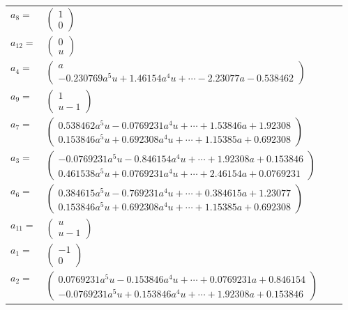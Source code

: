 \documentclass[1p]{elsarticle_modified}
\theoremstyle{definition}
\begin{document}
\begin{tabular}{m{7pt} m{180pt} m{7pt} m{180pt} }
\flushright $a_{8}=$&$\begin{pmatrix}1\\0\end{pmatrix}$ \\
\flushright $a_{12}=$&$\begin{pmatrix}0\\u\end{pmatrix}$ \\
\flushright $a_{4}=$&$\begin{pmatrix}a\\-0.230769 a^{5} u+1.46154 a^{4} u+\cdots-2.23077 a-0.538462\end{pmatrix}$ \\
\flushright $a_{9}=$&$\begin{pmatrix}1\\u-1\end{pmatrix}$ \\
\flushright $a_{7}=$&$\begin{pmatrix}0.538462 a^{5} u-0.0769231 a^{4} u+\cdots+1.53846 a+1.92308\\0.153846 a^{5} u+0.692308 a^{4} u+\cdots+1.15385 a+0.692308\end{pmatrix}$ \\
\flushright $a_{3}=$&$\begin{pmatrix}-0.0769231 a^{5} u-0.846154 a^{4} u+\cdots+1.92308 a+0.153846\\0.461538 a^{5} u+0.0769231 a^{4} u+\cdots+2.46154 a+0.0769231\end{pmatrix}$ \\
\flushright $a_{6}=$&$\begin{pmatrix}0.384615 a^{5} u-0.769231 a^{4} u+\cdots+0.384615 a+1.23077\\0.153846 a^{5} u+0.692308 a^{4} u+\cdots+1.15385 a+0.692308\end{pmatrix}$ \\
\flushright $a_{11}=$&$\begin{pmatrix}u\\u-1\end{pmatrix}$ \\
\flushright $a_{1}=$&$\begin{pmatrix}-1\\0\end{pmatrix}$ \\
\flushright $a_{2}=$&$\begin{pmatrix}0.0769231 a^{5} u-0.153846 a^{4} u+\cdots+0.0769231 a+0.846154\\-0.0769231 a^{5} u+0.153846 a^{4} u+\cdots+1.92308 a+0.153846\end{pmatrix}$ \\

\end{tabular}
\end{document}
